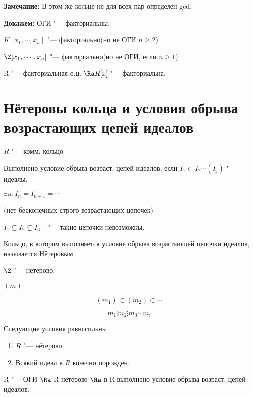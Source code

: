 \textbf{Замечание:} В этом же кольце не для всех пар определен gcd.

\textbf{Докажем:} ОГИ "--- факториальны.

$K[x_1, \cdots, x_n]$ "--- факториально(но не ОГИ $n \ge 2$)

$\Z[x_1, \cdots, x_n]$ "--- факториально(но не ОГИ, если $n \ge 1$)

R "--- факториальная о.ц. $\Ra R[x]$ "--- факториальна.


\section{Нётеровы кольца и условия обрыва возрастающих цепей идеалов}

$R$ "--- комм. кольцо

Выполнено условие обрыва возраст. цепей идеалов, если $I_1 \subset I_2 \cdots (I_j)$ "--- идеалы.

$\exists n \colon I_n = I_{n + 1} = \cdots$

(нет бесконечных строго возрастающих цепочек)

$I_1 \subsetneq I_2 \subsetneq I_3 \cdots$ "--- такие цепочки невозможны. 

\begin{Def}
Кольцо, в котором выполняется условие обрыва возрастающей цепочки идеалов, называется Нётеровым.
\end{Def}

\begin{exmp}
$\Z$ "--- нётерово.

$(m)$

$$(m_1) \subset (m_2) \subset \cdots $$

$$m_1 \vdots m_2 \vdots m_3 \cdots m_i$$
\end{exmp}

\begin{theorem}{}
Следующие условия равносильны
\begin{enumerate}
\item $R$ "--- нётерово.
\item Всякий идеал в $R$ конечно порожден.
\end{enumerate}
\end{theorem}

\begin{conseq}
R "--- ОГИ $\Ra$ R нётерово $\Ra$ в R выполнено условие обрыва возраст. цепей идеалов. 
\end{conseq}

